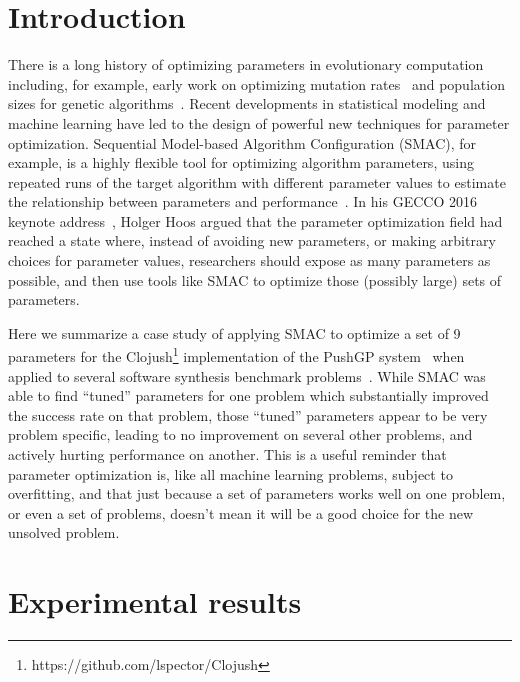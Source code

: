 \section{Introduction}
\label{sec:introduction}

There is a long history of optimizing parameters in evolutionary 
computation~\cite{lobo2007parameter}
including, for example, early work on optimizing mutation 
rates~\cite{back1993optimal} and population sizes for genetic algorithms~\cite{alander1992optimal}.
Recent developments in statistical modeling and machine learning have
led to the design of powerful new techniques for parameter optimization. 
Sequential Model-based Algorithm Configuration (SMAC), for example, is a
highly flexible tool for optimizing algorithm parameters, using repeated runs
of the target algorithm with different parameter values to estimate
the relationship between parameters and performance~\cite{HutHooLey11-SMAC}. In his GECCO 2016 keynote 
address~\cite{Hoos:2016:TCM:2908812.2908960}, Holger Hoos argued
that the parameter optimization field had reached a state where, 
instead of avoiding new
parameters, or making arbitrary choices for parameter values, researchers
should expose as many parameters as possible, and then use tools like
SMAC to optimize those (possibly large) sets of parameters.

Here we summarize a case study of applying SMAC to optimize a
set of 9 parameters for the Clojush\footnote{https://github.com/lspector/Clojush} 
implementation of the PushGP system~\cite{spector:2002:GPEM,push3gecco}
when applied to several software synthesis 
benchmark problems~\cite{Helmuth:2015:GECCO}. While SMAC was able to
find ``tuned'' parameters for one problem which substantially improved
the success rate on that problem, those ``tuned'' parameters appear to
be very problem specific, leading to no improvement on several other
problems, and actively hurting performance on another. This is a useful
reminder that parameter optimization is, like all machine learning problems,
subject to overfitting, and that just because a set of parameters works 
well on one problem, or even a set of problems, doesn't mean it will be
a good choice for the new unsolved problem.

\section{Experimental results}
\label{sec:experiments}

